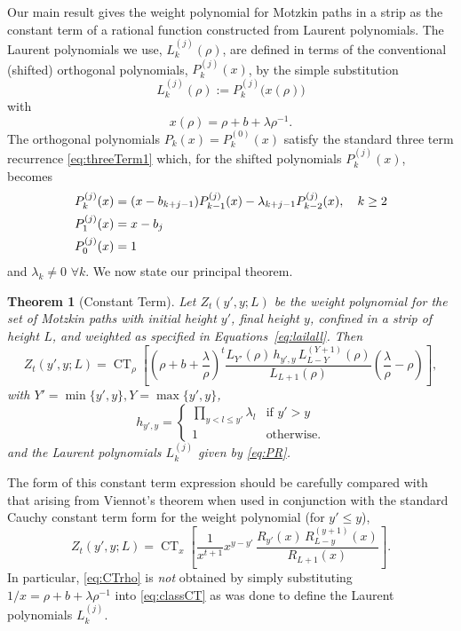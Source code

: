 \documentclass[11pt,a4paper]{article}
\DeclareMathOperator{\CT}{CT}
\newtheorem{theorem}{Theorem}
\newcommand{\la}{\lambda}
\newcommand{\p}{\rho}
\newcommand{\rP}{L}		%
\newcommand{\recip}[1]{R}		%
\newcommand{\df}{:=}
\begin{document}
 
Our  main result gives the weight polynomial for  Motzkin paths in a strip as the constant term  
 of a rational function constructed from Laurent  polynomials. The Laurent polynomials we use, $\rP_k^{(j)}(\p)$, are defined in terms of the conventional (shifted) orthogonal  polynomials, $P_k^{(j)}(x)$, by the simple substitution
\begin{equation}\label{eq:PR}
\rP_k^{(j)}(\p) \df  P_k^{(j)}\bigl(x(\p)\bigr)
\end{equation}
with  
\begin{equation} \label{eq:mup}
x(\p) =  \p+ b + \la \p^{-1}.
\end{equation}
The orthogonal  polynomials $P_k(x)=P_k^{(0)}(x)$ satisfy the standard three term recurrence \eqref{eq:threeTerm1} which, for the shifted polynomials $P_k^{(j)}(x)$, becomes
\begin{align} \label{eq:threetermrec}
	P_{k}^{(j)}(x) &= (x - b_{k+j-1})P_{k-1}^{(j)}(x) - \la_{k+j-1} P_{k-2}^{(j)}(x),\quad k\ge 2\\
	P_1^{(j)}(x) &= x-b_j\notag\\
	P_0^{(j)}(x) &= 1\notag
\end{align}
and $\la_k\ne0$ $\forall k$. We   now state our principal theorem. 
%
\begin{theorem}[Constant Term]
\label{thm:CT} 
	Let $Z_t(y',y;L)$ be the weight polynomial for the set of Motzkin paths with initial height $y'$, final height $y$, confined in a strip of height $L$, and weighted as specified in Equations~\eqref{eq:lailall}.  Then
\begin{equation} \label{eq:CTrho}
	Z_t(y',y;L)= \CT_\p \left [ \left (\p+ b +  \frac{\la}{\p} \right)^t 
	\frac{ \rP_{Y'}(\p)\, h_{y',y}\, \rP_{L-Y}^{(Y+1)}(\p) }{ \rP_{L+1}(\p)} \left (\frac{\la}{\p}-\p\right )\right ], 
\end{equation}
with $Y' =  \min \{ y', y\}, Y =  \max\{ y', y\}$, 
\begin{equation}
	h_{y',y}=\begin{cases}
			\prod_{y < l \le y'} \la_l & \text{if $y'> y$}\\
			1 & \text{otherwise.}
	\end{cases}
	\label{eq_hfactor}
\end{equation}
and the Laurent polynomials $\rP_k^{(j)}$ given by \eqref{eq:PR}.
\end{theorem}
%

The form of this constant term expression should be carefully compared with that arising from Viennot's theorem when used in conjunction with the standard Cauchy constant term form for the weight polynomial (for $y'\le y$),
\begin{equation}\label{eq:classCT}
	Z_t(y',y;L)= \CT_x\left[\frac{1}{x^{t+1}}x^{y-y'}\,\frac{\recip{P}_{y'}(x)\,  \recip{P}^{(y+1)}_{L-y}(x)}{\recip{P}_{L+1}(x)}\right].
\end{equation}
In particular, \eqref{eq:CTrho} is \emph{not} obtained by simply substituting $1/x=\p+ b + \la \p^{-1}$ into \eqref{eq:classCT} as was done to define the Laurent polynomials $\rP_k^{(j)}$.
\end{document}
